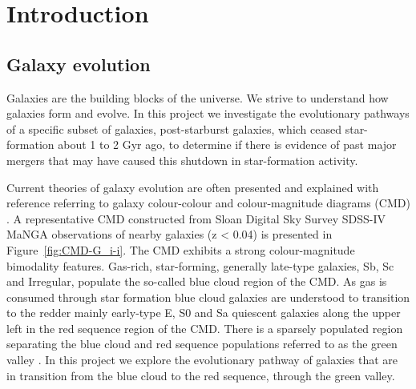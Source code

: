 \section{Introduction}
\label{sec:introduction}

\subsection{Galaxy evolution}
\label{sec:evolution}

Galaxies are the building blocks of the universe. We strive to understand how galaxies form and evolve. In this project we investigate the evolutionary pathways of a specific subset of galaxies, post-starburst galaxies, which ceased star-formation about 1 to 2 Gyr ago, to determine if there is evidence of past major mergers that may have caused this  shutdown in star-formation activity.

Current theories of galaxy evolution are often presented and explained  with reference referring to galaxy colour-colour and colour-magnitude diagrams (CMD) \citep[see e.g.][]{2001AJ....122.1861S, 2003ApJ...585L...5H, 2003ApJS..149..289B,baldry2004quantifying,2006MNRAS.373..469B}. A representative CMD constructed from Sloan Digital Sky Survey SDSS-IV MaNGA observations of nearby galaxies (z < 0.04) is presented in  Figure~\ref{fig:CMD-G_i-i}. The CMD exhibits a strong colour-magnitude bimodality features.  Gas-rich, star-forming, generally late-type galaxies, Sb, Sc and Irregular, populate the so-called blue cloud region of the CMD. As gas is consumed through star formation blue cloud galaxies are understood to transition to the redder mainly early-type E, S0 and Sa quiescent galaxies along the upper left in the red sequence region of the CMD. There is a sparsely populated region separating the blue cloud and red sequence populations referred to as the green valley \citep{2004ApJ...608..752B}. In this project we explore the evolutionary pathway of galaxies that are in transition from the blue cloud to the red sequence, through the green valley.

